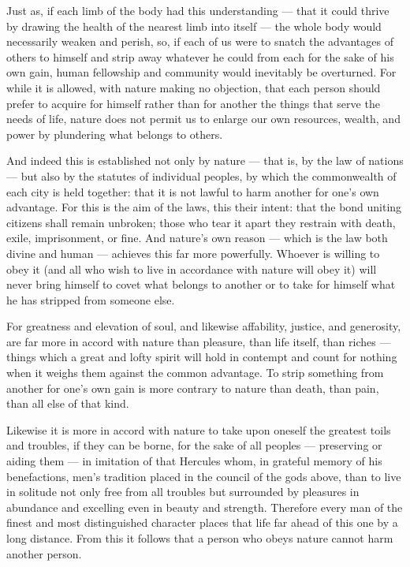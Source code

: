  Just as, if each limb of the body had this understanding — that it could thrive by drawing the health of the nearest limb into itself — the whole body would necessarily weaken and perish, so, if each of us were to snatch the advantages of others to himself and strip away whatever he could from each for the sake of his own gain, human fellowship and community would inevitably be overturned. For while it is allowed, with nature making no objection, that each person should prefer to acquire for himself rather than for another the things that serve the needs of life, nature does not permit us to enlarge our own resources, wealth, and power by plundering what belongs to others.

 And indeed this is established not only by nature — that is, by the law of nations — but also by the statutes of individual peoples, by which the commonwealth of each city is held together: that it is not lawful to harm another for one's own advantage. For this is the aim of the laws, this their intent: that the bond uniting citizens shall remain unbroken; those who tear it apart they restrain with death, exile, imprisonment, or fine. And nature's own reason — which is the law both divine and human — achieves this far more powerfully. Whoever is willing to obey it (and all who wish to live in accordance with nature will obey it) will never bring himself to covet what belongs to another or to take for himself what he has stripped from someone else.

 For greatness and elevation of soul, and likewise affability, justice, and generosity, are far more in accord with nature than pleasure, than life itself, than riches — things which a great and lofty spirit will hold in contempt and count for nothing when it weighs them against the common advantage. To strip something from another for one's own gain is more contrary to nature than death, than pain, than all else of that kind.

 Likewise it is more in accord with nature to take upon oneself the greatest toils and troubles, if they can be borne, for the sake of all peoples — preserving or aiding them — in imitation of that Hercules whom, in grateful memory of his benefactions, men's tradition placed in the council of the gods above, than to live in solitude not only free from all troubles but surrounded by pleasures in abundance and excelling even in beauty and strength. Therefore every man of the finest and most distinguished character places that life far ahead of this one by a long distance. From this it follows that a person who obeys nature cannot harm another person.


